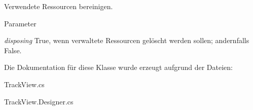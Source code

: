 Verwendete Ressourcen bereinigen. 


\begin{DoxyParams}{Parameter}
\item[{\em disposing}]True, wenn verwaltete Ressourcen gelöscht werden sollen; andernfalls False.\end{DoxyParams}


Die Dokumentation für diese Klasse wurde erzeugt aufgrund der Dateien:\begin{DoxyCompactItemize}
\item 
TrackView.cs\item 
TrackView.Designer.cs\end{DoxyCompactItemize}
